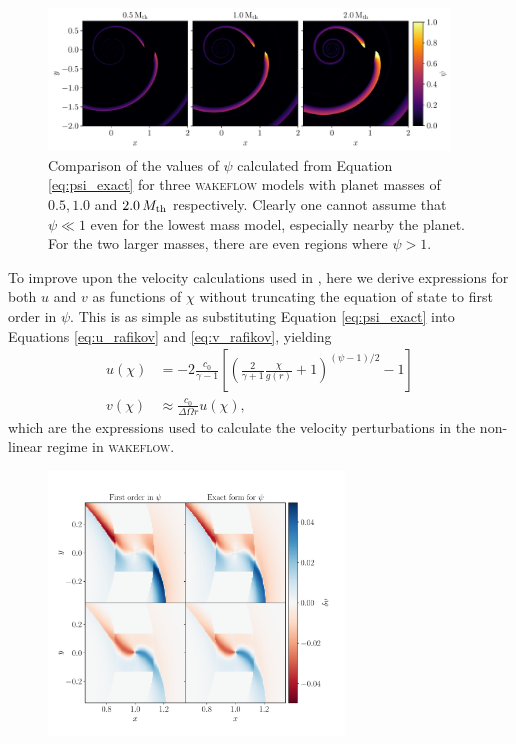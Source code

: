 \begin{figure}[H]
    \centering
    \includegraphics[width = 0.95\textwidth]{figures/psi 2.pdf}
    \caption{Comparison of the values of $\psi$ calculated from Equation \ref{eq:psi_exact} for three \textsc{wakeflow} models with planet masses of $0.5, 1.0$ and $2.0 \, M_{\rm{th}}$ respectively. Clearly one cannot assume that $\psi \ll 1$ even for the lowest mass model, especially nearby the planet. For the two larger masses, there are even regions where $\psi > 1$.}
    \label{fig:psi_comparison}
\end{figure}

To improve upon the velocity calculations used in \citet{bollati2021}, here we derive expressions for both $u$ and $v$ as functions of $\chi$ without truncating the equation of state to first order in $\psi$. This is as simple as substituting Equation \ref{eq:psi_exact} into Equations \ref{eq:u_rafikov} and \ref{eq:v_rafikov}, yielding
\begin{align}
    u(\chi) &= -2 \frac{c_0}{\gamma - 1} \left[ \left( \frac{2}{\gamma + 1} \frac{\chi}{g(r)} +1  \right)^{(\psi-1)/2} -1 \right] \\
    v(\chi) &\approx \frac{c_0}{\Delta\Omega r} u (\chi),
\end{align}
which are the expressions used to calculate the velocity perturbations in the non-linear regime in \textsc{wakeflow}. 

\begin{figure}[H]
    \centering
    \includegraphics[width = 0.7\textwidth]{figures/0_5_mth.pdf}
    \caption{}
    \label{fig:0_5mth}
\end{figure}

